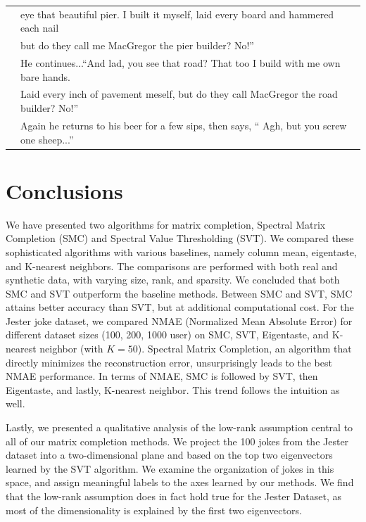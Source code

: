 \documentclass{article} %
\begin{document}
\begin{table} [h]
\begin{tabular}{c | l}
     & eye that beautiful pier. I built it myself, laid every board
       and hammered each nail \\
     & but do they call me MacGregor the pier builder? No!'' \\
     & He continues...``And lad, you see that road? That too I build with me
       own bare hands. \\
     & Laid every inch of pavement meself, but do they
       call MacGregor the road builder? No!''\\
     & Again he returns to his beer for a few sips, then says,
       `` Agh, but you screw  one sheep...''\\
\hline \hline
\end{tabular}
\label{joketexts}
\end{table}

\section{Conclusions}

We have presented two algorithms for matrix completion, Spectral
Matrix Completion (SMC) and Spectral Value Thresholding (SVT). We
compared these sophisticated algorithms with various baselines, namely
column mean, eigentaste, and K-nearest neighbors. The comparisons are
performed with both real and synthetic data, with varying size, rank,
and sparsity. We concluded that both SMC and SVT outperform the
baseline methods. Between SMC and SVT, SMC attains better accuracy
than SVT, but at additional computational cost. For the Jester joke
dataset, we compared NMAE (Normalized Mean Absolute Error) for
different dataset sizes ({100, 200, 1000} user) on SMC, SVT,
Eigentaste, and K-nearest neighbor (with $K=50$). Spectral Matrix
Completion, an algorithm that directly minimizes the reconstruction
error, unsurprisingly leads to the best NMAE performance. In terms of
NMAE, SMC is followed by SVT, then Eigentaste, and lastly, K-nearest
neighbor. This trend follows the intuition as well.

Lastly, we presented a qualitative analysis of the low-rank assumption
central to all of our matrix completion methods. We project the 100
jokes from the Jester dataset into a two-dimensional plane and based
on the top two eigenvectors learned by the SVT algorithm. We examine
the organization of jokes in this space, and assign meaningful labels
to the axes learned by our methods. We find that the low-rank
assumption does in fact hold true for the Jester Dataset, as most of
the dimensionality is explained by the first two eigenvectors.
\end{document}
